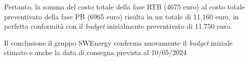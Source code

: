 Pertanto, la somma del costo totale della fase RTB (4675 euro) al costo totale preventivato della fase PB (6965 euro) risulta in un totale di 11.160 euro,
in perfetta conformità con il \textit{budget} inizialmente preventivato di 11.750 euro.


Il conclusione il gruppo SWEnergy conferma nuovamente il \textit{budget} iniziale stimato e anche la data di consegna prevista al 10/05/2024



